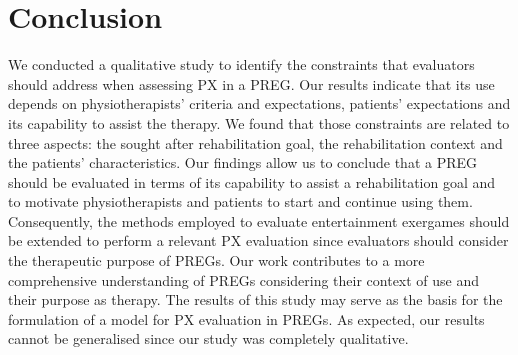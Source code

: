 \section{Conclusion}\label{sec:conclusion_char} %
We conducted a qualitative study to identify the constraints that evaluators should address when assessing \ac{PX} in a \ac{PREG}. Our results indicate that its use depends on physiotherapists' criteria and expectations, patients' expectations and its capability to assist the therapy.  We found that those constraints are related to three aspects: the sought after rehabilitation goal, the rehabilitation context and the patients' characteristics. Our findings allow us to conclude that a \ac{PREG} should be evaluated in terms of its capability to assist a rehabilitation goal and to motivate physiotherapists and patients to start and continue using them. Consequently, the methods employed to evaluate entertainment exergames should be extended to perform a relevant \ac{PX} evaluation since evaluators should consider the therapeutic purpose of \acp{PREG}. Our work contributes to a more comprehensive understanding of \acp{PREG} considering their context of use and their purpose as therapy. The results of this study may serve as the basis for the formulation of a model for \ac{PX} evaluation in \acp{PREG}. As expected, our results cannot be generalised since our study was completely qualitative.
